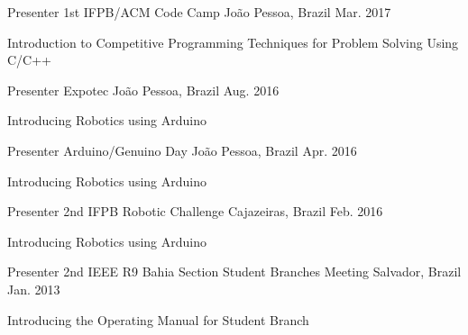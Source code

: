 

\begin{cventries}

  \cventry
    {Presenter} %
    {1st IFPB/ACM Code Camp} %
    {João Pessoa, Brazil} %
    {Mar. 2017} %
    {
      \begin{cvitems} %
        \item {Introduction to Competitive Programming Techniques for Problem Solving Using C/C++}
      \end{cvitems}
    }
    
  \cventry
    {Presenter} %
    {Expotec} %
    {João Pessoa, Brazil} %
    {Aug. 2016} %
    {
      \begin{cvitems} %
        \item {Introducing Robotics using Arduino}
      \end{cvitems}
    }


  \cventry
    {Presenter} %
    {Arduino/Genuino Day} %
    {João Pessoa, Brazil} %
    {Apr. 2016} %
    {
      \begin{cvitems} %
        \item {Introducing Robotics using Arduino}
      \end{cvitems}
    }

  \cventry
    {Presenter} %
    {2nd IFPB Robotic Challenge} %
    {Cajazeiras, Brazil} %
    {Feb. 2016} %
    {
      \begin{cvitems} %
        \item {Introducing Robotics using Arduino}
      \end{cvitems}
    }

  \cventry
    {Presenter} %
    {2nd IEEE R9 Bahia Section Student Branches Meeting} %
    {Salvador, Brazil} %
    {Jan. 2013} %
    {
      \begin{cvitems} %
        \item {Introducing the Operating Manual for Student Branch}
      \end{cvitems}
    }


\end{cventries}
